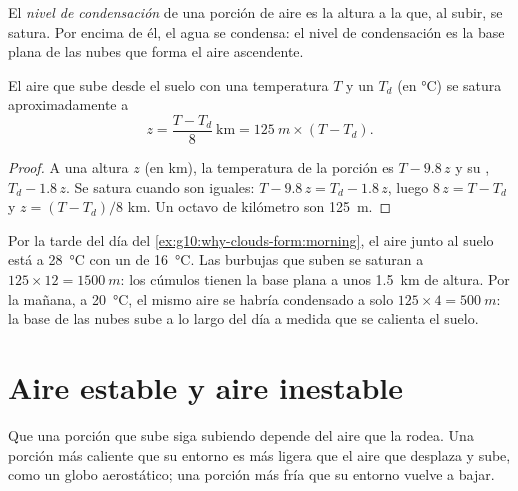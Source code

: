 \begin{definition}\label{def:g10:why-clouds-form:condensation-level}
El \emph{nivel de condensación}
de una porción de aire es la altura a la que, al subir, se satura. Por
encima de él, el agua se condensa: el nivel de condensación es la base
plana de las nubes que forma el aire ascendente.
\end{definition}

\begin{proposition}\label{prop:g10:why-clouds-form:lcl}
El aire que sube desde el suelo con una temperatura $T$ y un 
$T_d$ (en \unit{\degreeCelsius}) se satura aproximadamente a
\[
  z = \frac{T - T_d}{8}\ \text{km} = \qty{125}{m} \times (T - T_d).
\]
\end{proposition}

\begin{proof}
A una altura $z$ (en km), la temperatura de la porción es $T - 9.8\,z$ y su
, $T_d - 1.8\,z$. Se satura cuando son iguales:
$T - 9.8\,z = T_d - 1.8\,z$, luego $8\,z = T - T_d$ y $z = (T - T_d)/8$ km.
Un octavo de kilómetro son \qty{125}{m}.
\end{proof}

\begin{example}\label{ex:g10:why-clouds-form:base}
Por la tarde del día del \cref{ex:g10:why-clouds-form:morning}, el aire
junto al suelo está a \qty{28}{\degreeCelsius} con un  de
\qty{16}{\degreeCelsius}. Las burbujas que suben se saturan a
$125 \times 12 = \qty{1500}{m}$: los cúmulos tienen la base plana a unos
\qty{1.5}{km} de altura. Por la mañana, a \qty{20}{\degreeCelsius}, el mismo
aire se habría condensado a solo $125 \times 4 = \qty{500}{m}$: la base de
las nubes sube a lo largo del día a medida que se calienta el suelo.
\end{example}

\section{Aire estable y aire inestable}

Que una porción que sube siga subiendo depende del aire que la rodea. Una
porción más caliente que su entorno es más ligera que el aire que desplaza y
sube, como un globo aerostático; una porción más fría que su entorno vuelve
a bajar.

